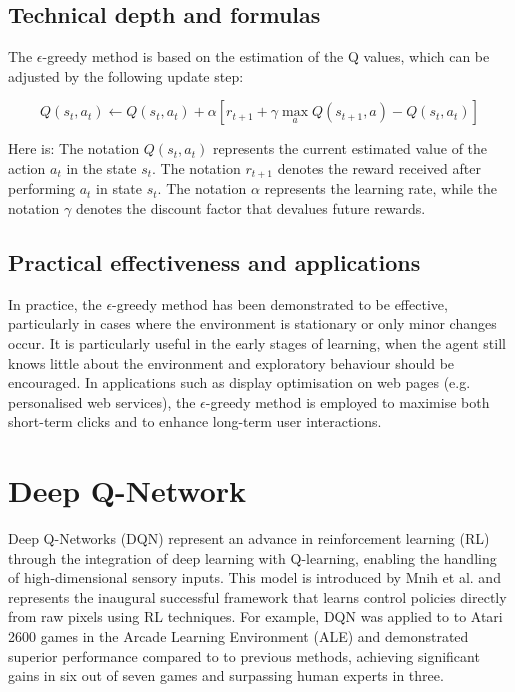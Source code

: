 \documentclass[twocolumn]{webofc}
\begin{document}
\subsection{Technical depth and formulas}
The $\epsilon$-greedy method is based on the estimation of the Q values, which can be adjusted by the following update step:

\begin{equation}
    Q(s_t, a_t) \leftarrow Q(s_t, a_t) + \alpha [r_{t+1} + \gamma \max_a Q(s_{t+1}, a) - Q(s_t, a_t)]
\end{equation}

Here is:
The notation $Q(s_t, a_t)$ represents the current estimated value of the action $a_t$ in the state $s_t$. The notation $r_{t+1}$ denotes the reward received after performing $a_t$ in state $s_t$. The notation $\alpha$ represents the learning rate, while the notation $\gamma$ denotes the discount factor that devalues future rewards.


\subsection{Practical effectiveness and applications}
In practice, the $\epsilon$-greedy method has been demonstrated to be effective, particularly in cases where the environment is stationary or only minor changes occur. It is particularly useful in the early stages of learning, when the agent still knows little about the environment and exploratory behaviour should be encouraged.
In applications such as display optimisation on web pages (e.g. personalised web services), the $\epsilon$-greedy method is employed to maximise both short-term clicks and to enhance long-term user interactions. \cite{sutton-2018}

\section{Deep Q-Network}
Deep Q-Networks (DQN) represent an advance in reinforcement learning (RL) through the integration of deep learning with Q-learning, enabling the handling of high-dimensional sensory inputs. This model is introduced by Mnih et al. \cite{mnih2013playingatarideepreinforcement} and represents the inaugural successful framework that learns control policies directly from raw pixels using RL techniques. For example, DQN was applied to to Atari 2600 games in the Arcade Learning Environment (ALE) and demonstrated superior performance compared to to previous methods, achieving significant gains in six out of seven games and surpassing human experts in three. \cite{mnih2013playingatarideepreinforcement}
\end{document}
